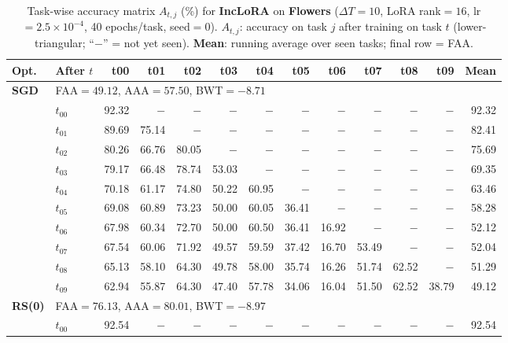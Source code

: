 \begin{table}[ht]
\centering
\caption{%
  Task-wise accuracy matrix $A_{t,j}$ (\%) for \textbf{IncLoRA} on \textbf{Flowers} ($\Delta T=10$, LoRA rank$=16$, lr$=2.5\times10^{-4}$, 40 epochs/task, seed$=0$).
  $A_{t,j}$: accuracy on task $j$ after training on task $t$  (lower-triangular; ``$-$'' = not yet seen).
  \textbf{Mean}: running average over seen tasks; final row = FAA.
}
\label{tab:raw_inclora_flowers}
\setlength{\tabcolsep}{2.8pt}
\renewcommand{\arraystretch}{0.88}
\scriptsize
\begin{tabular}{@{}l l r r r r r r r r r r r@{}}
\toprule
\textbf{Opt.} & \textbf{After $t$} & \textbf{t00} & \textbf{t01} & \textbf{t02} & \textbf{t03} & \textbf{t04} & \textbf{t05} & \textbf{t06} & \textbf{t07} & \textbf{t08} & \textbf{t09} & \textbf{Mean} \\
\midrule
\multirow{11}{*}{\textbf{SGD}} & \multicolumn{12}{l}{\quad\small FAA$=49.12$,\; AAA$=57.50$,\; BWT$=-8.71$} \\
 & $t_{00}$ & 92.32 & $-$ & $-$ & $-$ & $-$ & $-$ & $-$ & $-$ & $-$ & $-$ & 92.32 \\
 & $t_{01}$ & 89.69 & 75.14 & $-$ & $-$ & $-$ & $-$ & $-$ & $-$ & $-$ & $-$ & 82.41 \\
 & $t_{02}$ & 80.26 & 66.76 & 80.05 & $-$ & $-$ & $-$ & $-$ & $-$ & $-$ & $-$ & 75.69 \\
 & $t_{03}$ & 79.17 & 66.48 & 78.74 & 53.03 & $-$ & $-$ & $-$ & $-$ & $-$ & $-$ & 69.35 \\
 & $t_{04}$ & 70.18 & 61.17 & 74.80 & 50.22 & 60.95 & $-$ & $-$ & $-$ & $-$ & $-$ & 63.46 \\
 & $t_{05}$ & 69.08 & 60.89 & 73.23 & 50.00 & 60.05 & 36.41 & $-$ & $-$ & $-$ & $-$ & 58.28 \\
 & $t_{06}$ & 67.98 & 60.34 & 72.70 & 50.00 & 60.50 & 36.41 & 16.92 & $-$ & $-$ & $-$ & 52.12 \\
 & $t_{07}$ & 67.54 & 60.06 & 71.92 & 49.57 & 59.59 & 37.42 & 16.70 & 53.49 & $-$ & $-$ & 52.04 \\
 & $t_{08}$ & 65.13 & 58.10 & 64.30 & 49.78 & 58.00 & 35.74 & 16.26 & 51.74 & 62.52 & $-$ & 51.29 \\
 & $t_{09}$ & 62.94 & 55.87 & 64.30 & 47.40 & 57.78 & 34.06 & 16.04 & 51.50 & 62.52 & 38.79 & 49.12 \\
\midrule
\multirow{11}{*}{\textbf{RS(0)}} & \multicolumn{12}{l}{\quad\small FAA$=76.13$,\; AAA$=80.01$,\; BWT$=-8.97$} \\
 & $t_{00}$ & 92.54 & $-$ & $-$ & $-$ & $-$ & $-$ & $-$ & $-$ & $-$ & $-$ & 92.54 \\

\end{tabular}
\end{table}
